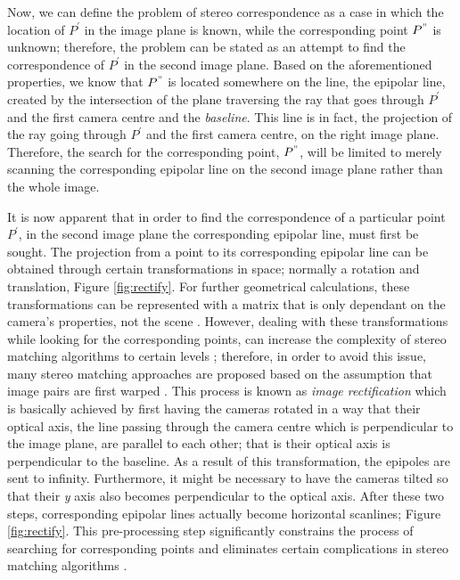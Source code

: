 Now, we can define the problem of stereo correspondence as a case in which the location of $P^{'}$ in the image plane is known, while the
corresponding point $P^{"}$ is unknown; therefore, the problem can be stated as an attempt to find the correspondence of $P^{'}$ in the second image plane. Based on the aforementioned 
properties, we know that $P^{"}$ is located somewhere on the line, the epipolar line,
created by the intersection of the plane traversing the ray that goes through $P^{'}$ and the first camera centre and the {\it baseline}. This line is in fact, the projection of the ray going
through $P^{'}$ and the first camera centre, on the right image plane. Therefore, the search for the corresponding point, $P^{"}$, will be limited to merely scanning the corresponding 
epipolar line on the second image plane rather than the whole image.


It is now apparent that in order to find the correspondence of a particular point $P^{'}$, in the second image plane
the corresponding epipolar line, must first be sought. 
The projection from a point to its corresponding epipolar line can be obtained through certain transformations in space; normally a rotation and translation, Figure \ref{fig:rectify}.
For further geometrical calculations, these transformations can be represented
with a matrix that is only dependant on the camera's properties, not the scene \cite{hart2000}.
However, dealing with these transformations while looking for the corresponding points, can increase the complexity of stereo matching algorithms to certain levels \cite{sze11}; therefore, 
in order to avoid this issue, many stereo matching approaches are proposed based on the assumption that image pairs are first warped \cite{sze11}.
This process is known as {\it image rectification} which is basically achieved by first having the cameras rotated in a way that their optical axis, 
the line passing through the camera centre which is perpendicular to the image plane, are parallel to each other; 
that is their optical axis is perpendicular to the baseline. As a result of this transformation, the epipoles are sent to infinity. 
Furthermore, it might be necessary to have the cameras tilted so that their {\it y} axis also becomes perpendicular to the optical axis. 
After these two steps, corresponding epipolar lines actually become horizontal scanlines; Figure \ref{fig:rectify}. This pre-processing step significantly constrains the process of searching 
for corresponding points and eliminates certain complications in stereo matching algorithms \cite{sze11}.

